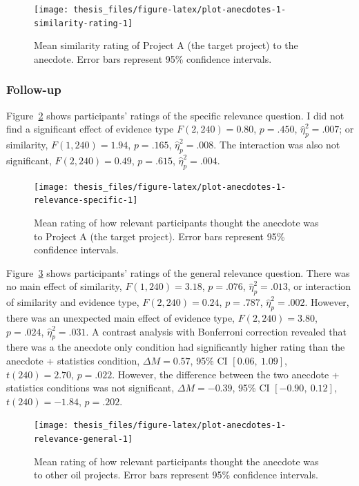 \documentclass[a4paper, nobind, dvipsnames]{templates/ociamthesis}
\theoremstyle{definition}
\theoremstyle{definition}
\theoremstyle{definition}
\theoremstyle{definition}
\theoremstyle{remark}
\begin{document}
\begin{figure}
\texttt{[image: thesis\_files/figure-latex/plot-anecdotes-1-similarity-rating-1]} \caption{Mean similarity rating of Project A (the target project) to the anecdote. Error bars represent 95\% confidence intervals.}\label{fig:plot-anecdotes-1-similarity-rating}
\end{figure}

\hypertarget{follow-up-5}{%
\subsubsection{Follow-up}\label{follow-up-5}}

Figure~\ref{fig:plot-anecdotes-1-relevance-specific} shows participants' ratings
of the specific relevance question. I did not find a significant effect of
evidence type \(F(2, 240) = 0.80\), \(p = .450\), \(\hat{\eta}^2_p = .007\); or
similarity, \(F(1, 240) = 1.94\), \(p = .165\), \(\hat{\eta}^2_p = .008\). The
interaction was also not significant,
\(F(2, 240) = 0.49\), \(p = .615\), \(\hat{\eta}^2_p = .004\).



\begin{figure}
\texttt{[image: thesis\_files/figure-latex/plot-anecdotes-1-relevance-specific-1]} \caption{Mean rating of how relevant participants thought the anecdote was to Project A (the target project). Error bars represent 95\% confidence intervals.}\label{fig:plot-anecdotes-1-relevance-specific}
\end{figure}

Figure~\ref{fig:plot-anecdotes-1-relevance-general} shows participants' ratings
of the general relevance question. There was no main effect of similarity,
\(F(1, 240) = 3.18\), \(p = .076\), \(\hat{\eta}^2_p = .013\), or interaction of
similarity and evidence type,
\(F(2, 240) = 0.24\), \(p = .787\), \(\hat{\eta}^2_p = .002\). However, there was
an unexpected main effect of evidence type,
\(F(2, 240) = 3.80\), \(p = .024\), \(\hat{\eta}^2_p = .031\). A contrast analysis with
Bonferroni correction revealed that there was a the anecdote only condition had
significantly higher rating than the anecdote + statistics condition,
\(\Delta M = 0.57\), 95\% CI \([0.06,~1.09]\), \(t(240) = 2.70\), \(p = .022\). However, the
difference between the two anecdote + statistics conditions was not significant,
\(\Delta M = -0.39\), 95\% CI \([-0.90,~0.12]\), \(t(240) = -1.84\), \(p = .202\).



\begin{figure}
\texttt{[image: thesis\_files/figure-latex/plot-anecdotes-1-relevance-general-1]} \caption{Mean rating of how relevant participants thought the anecdote was to other oil projects. Error bars represent 95\% confidence intervals.}\label{fig:plot-anecdotes-1-relevance-general}
\end{figure}
\end{document}
